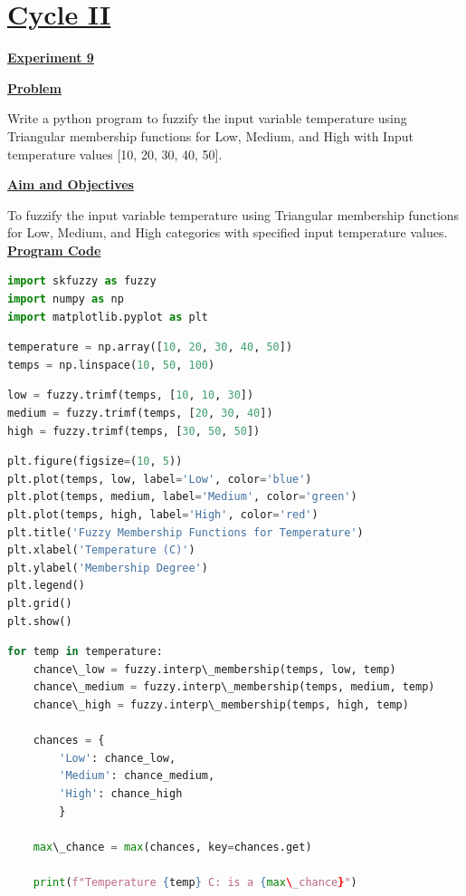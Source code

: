 \documentclass[a4paper,12pt]{article}
\begin{document}
\newpage

\section*{\underline{Cycle II}}
\begin{center}
\textbf{\underline{Experiment 9}}
\label{exp9}
\end{center}

\vspace{1em}
\noindent
\textbf{\underline{Problem}}\par
\noindent
Write a python program to fuzzify the input variable temperature using Triangular membership functions for Low, Medium, and High with Input temperature values [10, 20, 30, 40, 50].


\vspace{1em}
\noindent
\textbf{\underline{Aim and Objectives}}\par
\noindent
To fuzzify the input variable temperature using Triangular membership functions for Low, Medium, and High categories with specified input temperature values.
\vspace{1em}
\noindent
\textbf{\underline{Program Code}}
\noindent
\begin{lstlisting}[language=Python]
import skfuzzy as fuzzy
import numpy as np
import matplotlib.pyplot as plt
\end{lstlisting}

\begin{lstlisting}[language=Python]
temperature = np.array([10, 20, 30, 40, 50])
temps = np.linspace(10, 50, 100)
\end{lstlisting}

\begin{lstlisting}[language=Python]
low = fuzzy.trimf(temps, [10, 10, 30])
medium = fuzzy.trimf(temps, [20, 30, 40])
high = fuzzy.trimf(temps, [30, 50, 50])
\end{lstlisting}

\begin{lstlisting}[language=Python]
plt.figure(figsize=(10, 5))
plt.plot(temps, low, label='Low', color='blue')
plt.plot(temps, medium, label='Medium', color='green')
plt.plot(temps, high, label='High', color='red')
plt.title('Fuzzy Membership Functions for Temperature')
plt.xlabel('Temperature (C)')
plt.ylabel('Membership Degree')
plt.legend()
plt.grid()
plt.show()
\end{lstlisting}


\begin{lstlisting}[language=Python]
for temp in temperature:
    chance\_low = fuzzy.interp\_membership(temps, low, temp)
    chance\_medium = fuzzy.interp\_membership(temps, medium, temp)
    chance\_high = fuzzy.interp\_membership(temps, high, temp)

    chances = {
        'Low': chance_low,
        'Medium': chance_medium,
        'High': chance_high
        }
    
    max\_chance = max(chances, key=chances.get)

    print(f"Temperature {temp} C: is a {max\_chance}")
\end{lstlisting}
\end{document}
